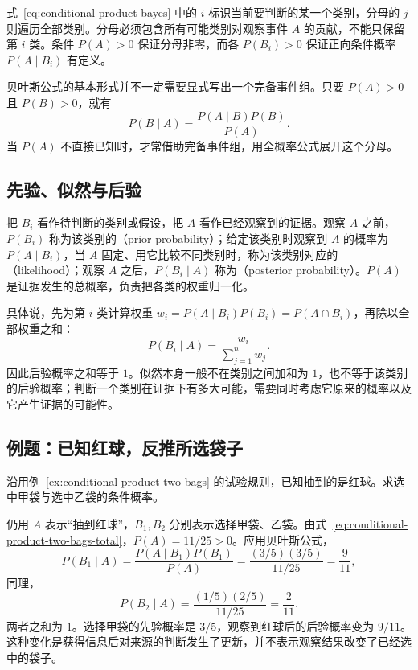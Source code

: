 \documentclass[UTF8]{ctexart}
\begin{document}
式~\eqref{eq:conditional-product-bayes} 中的 $i$ 标识当前要判断的某一个类别，分母的 $j$ 则遍历全部类别。分母必须包含所有可能类别对观察事件 $A$ 的贡献，不能只保留第 $i$ 类。条件 $P(A)>0$ 保证分母非零，而各 $P(B_i)>0$ 保证正向条件概率 $P(A\mid B_i)$ 有定义。

贝叶斯公式的基本形式并不一定需要显式写出一个完备事件组。只要 $P(A)>0$ 且 $P(B)>0$，就有
\begin{equation}
  P(B\mid A)=\frac{P(A\mid B)P(B)}{P(A)}.
  \label{eq:conditional-product-bayes-basic}
\end{equation}
当 $P(A)$ 不直接已知时，才常借助完备事件组，用全概率公式展开这个分母。

\subsection{先验、似然与后验}

把 $B_i$ 看作待判断的类别或假设，把 $A$ 看作已经观察到的证据。观察 $A$ 之前，$P(B_i)$ 称为该类别的（prior probability）；给定该类别时观察到 $A$ 的概率为 $P(A\mid B_i)$，当 $A$ 固定、用它比较不同类别时，称为该类别对应的（likelihood）；观察 $A$ 之后，$P(B_i\mid A)$ 称为（posterior probability）。$P(A)$ 是证据发生的总概率，负责把各类的权重归一化。

具体说，先为第 $i$ 类计算权重 $w_i=P(A\mid B_i)P(B_i)=P(A\cap B_i)$，再除以全部权重之和：
\begin{equation}
  P(B_i\mid A)=\frac{w_i}{\sum_{j=1}^{n}w_j}.
  \label{eq:conditional-product-posterior-weights}
\end{equation}
因此后验概率之和等于 $1$。似然本身一般不在类别之间加和为 $1$，也不等于该类别的后验概率；判断一个类别在证据下有多大可能，需要同时考虑它原来的概率以及它产生证据的可能性。

\subsection{例题：已知红球，反推所选袋子}

\begin{example}[由结果推断来源]
\label{ex:conditional-product-bags-posterior}
沿用例~\ref{ex:conditional-product-two-bags} 的试验规则，已知抽到的是红球。求选中甲袋与选中乙袋的条件概率。
\end{example}
\begin{solve}
仍用 $A$ 表示“抽到红球”，$B_1,B_2$ 分别表示选择甲袋、乙袋。由式~\eqref{eq:conditional-product-two-bags-total}，$P(A)=11/25>0$。应用贝叶斯公式，
\begin{equation}
  P(B_1\mid A)
  =\frac{P(A\mid B_1)P(B_1)}{P(A)}
  =\frac{(3/5)(3/5)}{11/25}
  =\frac9{11},
  \label{eq:conditional-product-bags-posterior-one}
\end{equation}
同理，
\[
  P(B_2\mid A)
  =\frac{(1/5)(2/5)}{11/25}
  =\frac2{11}.
\]
两者之和为 $1$。选择甲袋的先验概率是 $3/5$，观察到红球后的后验概率变为 $9/11$。这种变化是获得信息后对来源的判断发生了更新，并不表示观察结果改变了已经选中的袋子。
\end{solve}
\end{document}

